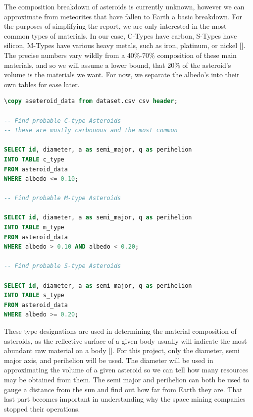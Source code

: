 \documentclass[12pt]{report}
\begin{document}
The composition breakdown of asteroids is currently unknown, however we can approximate from meteorites that have fallen to Earth a basic breakdown. For the purposes of simplifying the report, we are only interested in the most common types of materials. In our case, C-Types have carbon, S-Types have silicon, M-Types have various heavy metals, such as iron, platinum, or nickel [\cite{Rivkin}]. The precise numbers vary wildly from a 40\%-70\% composition of these main materials, and so we will assume a lower bound, that 20\% of the asteroid's volume is the materials we want. For now, we separate the albedo's into their own tables for ease later.

\thispagestyle{empty}


\begin{lstlisting}[language=sql, deletekeywords={IDENTITY},
		deletekeywords={[2]INT},
		morekeywords={clustered},
		framesep=8pt,
		xleftmargin=40pt,
		framexleftmargin=40pt,
		frame=tb,
		framerule=0pt]
\copy aseteroid_data from dataset.csv csv header;

-- Find probable C-type Asteroids
-- These are mostly carbonous and the most common

SELECT id, diameter, a as semi_major, q as perihelion 
INTO TABLE c_type
FROM asteroid_data
WHERE albedo <= 0.10;

-- Find probable M-type Asteroids

SELECT id, diameter, a as semi_major, q as perihelion 
INTO TABLE m_type
FROM asteroid_data
WHERE albedo > 0.10 AND albedo < 0.20;

-- Find probable S-type Asteroids

SELECT id, diameter, a as semi_major, q as perihelion 
INTO TABLE s_type
FROM asteroid_data
WHERE albedo >= 0.20;
\end{lstlisting}

These type designations are used in determining the material composition of asteroids, as the reflective surface of a given body usually will indicate the most abundant raw material on a body [\cite{ORourke}]. For this project, only the diameter, semi major axis, and perihelion will be used. The diameter will be used in approximating the volume of a given asteroid so we can tell how many resources may be obtained from them. The semi major and perihelion can both be used to gauge a distance from the sun and find out how far from Earth they are. That last part becomes important in understanding why the space mining companies stopped their operations.
\end{document}
